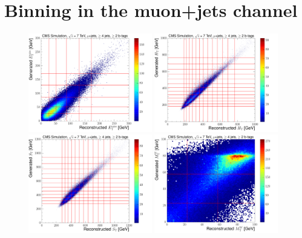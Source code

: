 \section{Binning in the muon+jets channel}
\label{as:binning_muon}

\begin{figure}[H]
    \centering
     \includegraphics[width=0.48\textwidth]{Chapters/04_Analysis/04b_XSections/images/binning/muon_MET_7TeV.pdf}\hfill
     \includegraphics[width=0.48\textwidth]{Chapters/04_Analysis/04b_XSections/images/binning/muon_HT_7TeV.pdf}\\
     \includegraphics[width=0.48\textwidth]{Chapters/04_Analysis/04b_XSections/images/binning/muon_ST_7TeV.pdf}\hfill
     \includegraphics[width=0.48\textwidth]{Chapters/04_Analysis/04b_XSections/images/binning/muon_MT_7TeV.pdf}\\

\end{figure}
